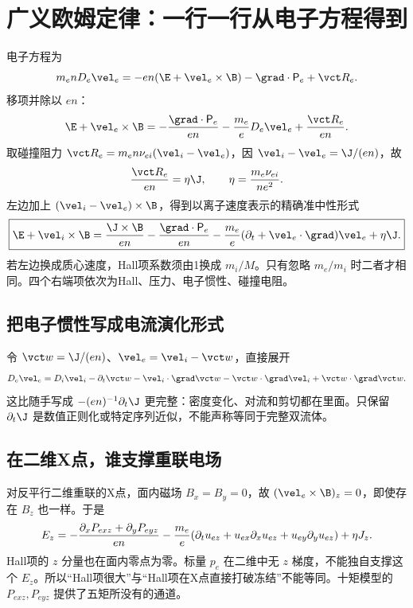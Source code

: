 \section{广义欧姆定律：一行一行从电子方程得到}
电子方程为
\begin{equation}m_enD_e\vel_e=-en(\E+\vel_e\times\B)-\grad\cdot\mathsf P_e+\vct R_e.
\end{equation}
移项并除以 $en$：
\begin{equation}\E+\vel_e\times\B=-{\grad\cdot\mathsf P_e\over en}-{m_e\over e}D_e\vel_e+{\vct R_e\over en}.\label{eq:electronohm}\end{equation}
取碰撞阻力 $\vct R_e=m_en\nu_{ei}(\vel_i-\vel_e)$，因 $\vel_i-\vel_e=\J/(en)$，故
\begin{equation}{\vct R_e\over en}=\eta\J,\qquad \eta={m_e\nu_{ei}\over ne^2}.
\end{equation}
左边加上 $(\vel_i-\vel_e)\times\B$，得到以离子速度表示的精确准中性形式
\begin{equation}
\boxed{\E+\vel_i\times\B={\J\times\B\over en}-{\grad\cdot\mathsf P_e\over en}
-{m_e\over e}(\partial_t+\vel_e\cdot\grad)\vel_e+\eta\J.}\label{eq:gohm}
\end{equation}
若左边换成质心速度，Hall项系数须由1换成 $m_i/M$。只有忽略 $m_e/m_i$ 时二者才相同。四个右端项依次为Hall、压力、电子惯性、碰撞电阻。

\subsection{把电子惯性写成电流演化形式}
令 $\vct w=\J/(en)$、$\vel_e=\vel_i-\vct w$，直接展开
\begin{equation}
D_e\vel_e=D_i\vel_i-\partial_t\vct w-\vel_i\cdot\grad\vct w-\vct w\cdot\grad\vel_i+\vct w\cdot\grad\vct w.\label{eq:inertiaexpanded}
\end{equation}
这比随手写成 $-(en)^{-1}\partial_t\J$ 更完整：密度变化、对流和剪切都在里面。只保留 $\partial_t\J$ 是数值正则化或特定序列近似，不能声称等同于完整双流体。

\subsection{在二维X点，谁支撑重联电场}
对反平行二维重联的X点，面内磁场 $B_x=B_y=0$，故 $(\vel_e\times\B)_z=0$，即使存在 $B_z$ 也一样。于是
\begin{equation}
E_z=-{\partial_xP_{exz}+\partial_yP_{eyz}\over en}
-{m_e\over e}(\partial_tu_{ez}+u_{ex}\partial_xu_{ez}+u_{ey}\partial_yu_{ez})+\eta J_z.\label{eq:xpoint}
\end{equation}
Hall项的 $z$ 分量也在面内零点为零。标量 $p_e$ 在二维中无 $z$ 梯度，不能独自支撑这个 $E_z$。所以“Hall项很大”与“Hall项在X点直接打破冻结”不能等同。十矩模型的 $P_{exz},P_{eyz}$ 提供了五矩所没有的通道。\citep{Wang2015}

